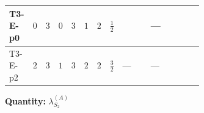 \documentclass[8pt]{article}
\begin{document}
\begin{landscape}
\begin{longtable}{@{}llcccccc >{\raggedright\arraybackslash}p{0.21\linewidth} >{\raggedright\arraybackslash}p{0.21\linewidth} >{\raggedright\arraybackslash}p{0.21\linewidth}@{}}
\midrule
T3-E-p0 & $0$ & $3$ & $0$ & $3$ & $1$ & $2$ & $\frac{1}{2}$ & \scriptsize\adjustbox{max width=\linewidth}{$\begin{gathered} +\frac{3 {g_1}^4}{2}\end{gathered}$} & --- & \scriptsize\adjustbox{max width=\linewidth}{$\begin{gathered} +\frac{{\lambda_{HS_2}^{(1)}}^2}{2}\end{gathered}$} \\
\midrule
T3-E-p2 & $2$ & $3$ & $1$ & $3$ & $2$ & $2$ & $\frac{3}{2}$ & --- & --- & \scriptsize\adjustbox{max width=\linewidth}{$\begin{gathered} +\frac{{\lambda_{HS_2}^{(1)}}^2}{2}\end{gathered}$} \\
\midrule
\bottomrule
\end{longtable}
\clearpage
\noindent\textbf{Quantity: }$\lambda_{S_2}^{(A)}$\par\smallskip

\end{landscape}
\end{document}
